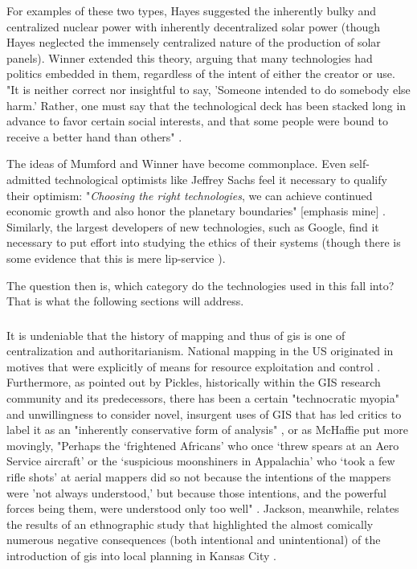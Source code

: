 For examples of these two types, Hayes suggested the inherently bulky and centralized nuclear power with inherently decentralized solar power \cite{hayesRaysHopeTransition1977} (though Hayes neglected the immensely centralized nature of the production of solar panels). Winner extended this theory, arguing that many technologies had politics embedded in them, regardless of the intent of either the creator or use. "It is neither correct nor insightful to say, 'Someone intended to do somebody else harm.' Rather, one must say that the technological deck has been stacked long in advance to favor certain social interests, and that some people were bound to receive a better hand than others" \cite{winnerArtifactsHavePolitics1980}.

The ideas of Mumford and Winner have become commonplace. Even self-admitted technological optimists like Jeffrey Sachs \cite{sachsOptimismNewYear2021} feel it necessary to qualify their optimism: "\textit{Choosing the right technologies}, we can achieve continued economic growth and also honor the planetary boundaries" [emphasis mine] \cite{sachsAgeSustainableDevelopment2015}. Similarly, the largest developers of new technologies, such as Google, find it necessary to put effort into studying the ethics of their systems (though there is some evidence that this is mere lip-service \cite{simoniteWhatReallyHappened}). 

The question then is, which category do the technologies used in this fall into? That is what the following sections will address.

\subsubsection{}

It is undeniable that the history of mapping and thus of \ac{gis} is one of centralization and authoritarianism. National mapping in the US originated in motives that were explicitly of means for resource exploitation and control \cite{mchaffieManufacturingMetaphors1994}. Furthermore, as pointed out by Pickles, historically within the GIS research community and its predecessors, there has been a certain "technocratic myopia" and unwillingness to consider novel, insurgent uses of GIS that has led critics to label it as an "inherently conservative form of analysis" \cite{picklesRepresentationsElectronicAge1994}, or as McHaffie put more movingly, "Perhaps the `frightened Africans' who once `threw spears at an Aero Service aircraft' or the `suspicious moonshiners in Appalachia' who `took a few rifle shots' at aerial mappers did so not because the intentions of the mappers were 'not always understood,' but because those intentions, and the powerful forces being them, were understood only too well" \cite{mchaffieManufacturingMetaphors1994}. Jackson, meanwhile, relates the results of an ethnographic study that highlighted the almost comically numerous negative consequences (both intentional and unintentional) of the introduction of \ac{gis} into local planning in Kansas City \cite{jacksonCityThirtyThousand2008}.

